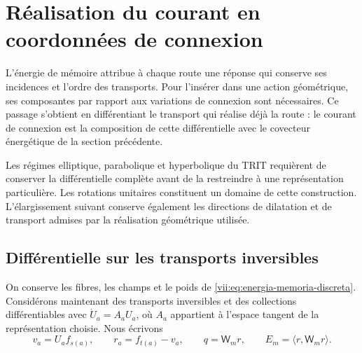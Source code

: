 
\section{Réalisation du courant en coordonnées de connexion}
\label{vii:sec:composicion-corriente-conexion}

L'énergie de mémoire attribue à chaque route une réponse qui conserve ses incidences et l'ordre des transports. Pour l'insérer dans une action géométrique, ses composantes par rapport aux variations de connexion sont nécessaires. Ce passage s'obtient en différentiant le transport qui réalise déjà la route : le courant de connexion est la composition de cette différentielle avec le covecteur énergétique de la section précédente.

Les régimes elliptique, parabolique et hyperbolique du TRIT requièrent de
conserver la différentielle complète avant de la restreindre à une
représentation particulière. Les rotations unitaires constituent un
domaine de cette construction. L'élargissement suivant conserve également
les directions de dilatation et de transport admises par la réalisation
géométrique utilisée.

\subsection{Différentielle sur les transports inversibles}

On conserve les fibres, les champs et le poids de \eqref{vii:eq:energia-memoria-discreta}. Considérons maintenant des transports inversibles et des collections différentiables avec \(\dot U_a=A_aU_a\), où \(A_a\) appartient à l'espace tangent de la représentation choisie. Nous écrivons
\[
 v_a=U_af_{s(a)},\qquad r_a=f_{t(a)}-v_a,\qquad
 q=\mathsf W_mr,\qquad E_m=\langle r,\mathsf W_mr\rangle.
\]

